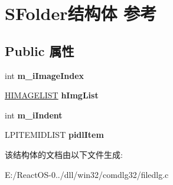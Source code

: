 \hypertarget{struct_s_folder}{}\section{S\+Folder结构体 参考}
\label{struct_s_folder}
\subsection*{Public 属性}
\begin{DoxyCompactItemize}
\item 
\mbox{\label{struct_s_folder_a134560c2448930700f6cb2af075258dd}} 
int {\bfseries m\+\_\+i\+Image\+Index}
\item 
\mbox{\label{struct_s_folder_ada0d8c35ae820e39da696291b46ed1b2}} 
\hyperlink{struct___i_m_a_g_e_l_i_s_t}{H\+I\+M\+A\+G\+E\+L\+I\+ST} {\bfseries h\+Img\+List}
\item 
\mbox{\label{struct_s_folder_a0098973d90ff424a8c43d8ca40d21dd3}} 
int {\bfseries m\+\_\+i\+Indent}
\item 
\mbox{\label{struct_s_folder_afc0d686670163c11f6d85330be67f47a}} 
L\+P\+I\+T\+E\+M\+I\+D\+L\+I\+ST {\bfseries pidl\+Item}
\end{DoxyCompactItemize}


该结构体的文档由以下文件生成\+:\begin{DoxyCompactItemize}
\item 
E\+:/\+React\+O\+S-\/0../dll/win32/comdlg32/filedlg.\+c\end{DoxyCompactItemize}
